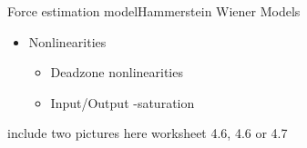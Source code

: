 


\begin{frame}{Force estimation model}{Hammerstein Wiener Models}
\begin{itemize}
  \item Nonlinearities
  \begin{itemize}
    \item Deadzone nonlinearities
    \item Input/Output -saturation 
  \end{itemize}
\end{itemize}




include two pictures here worksheet 4.6, 4.6 or 4.7



\begin{columns}[T]
\centering
\begin{column}{.49\textwidth}


\end{column}%
\hfill%
\begin{column}{.49\textwidth}


\end{column}
\end{columns}



\end{frame}












